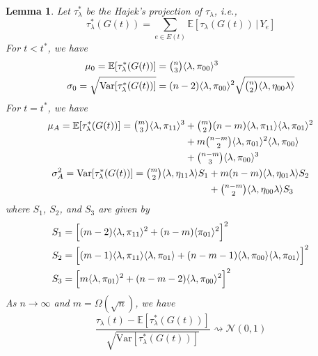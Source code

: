 \documentclass[final]{IEEEtran}
\newtheorem{lemma}[theorem]{Lemma}
\theoremstyle{definition}
\begin{document}
\begin{lemma}
  \label{lem:3}
  Let $\tau_{\lambda}^{*}$ be the Hajek's projection of $\tau_{\lambda}$, i.e.,
\begin{equation}
  \label{eq:46}
  \tau_{\lambda}^{*}(G(t)) = \sum_{e \in E(t)} \mathbb{E}[
  \tau_{\lambda}(G(t)) \, \lvert \, Y_{e}]
\end{equation}
For $t < t^{*}$, we have
\begin{align*}
  \mu_0 = \mathbb{E}[\tau_{\lambda}^{*}(G(t))] &= \tbinom{n}{3} \langle 
  \lambda, \pi_{00} \rangle^{3} \\
  \sigma_0 = \sqrt{\mathrm{Var}[\tau_{\lambda}^{*}(G(t))]} &= (n-2) \langle \lambda,
  \pi_{00} \rangle^{2} \sqrt{\tbinom{n}{2} \langle \lambda, \eta_{00}
  \lambda \rangle}
\end{align*}
For $t = t^{*}$, we have
  \begin{gather*}
    \label{eq:42}
    \begin{split}
    \mu_A = \mathbb{E}[\tau_{\lambda}^{*}(G(t))] = \tbinom{m}{3}
    \langle \lambda, \pi_{11} \rangle^{3} &+
    \tbinom{m}{2}(n-m) \langle \lambda, \pi_{11} \rangle \langle
    \lambda, \pi_{01} \rangle^{2} \\ &+ m \tbinom{n-m}{2} \langle \lambda,
    \pi_{01} \rangle^{2} \langle \lambda, \pi_{00} \rangle \\ &+
    \tbinom{n-m}{3} \langle \lambda, \pi_{00} \rangle^{3}
    \end{split} \\
    \begin{split}
    \sigma_A^{2} = \mathrm{Var}[\tau_{\lambda}^{*}(G(t))] = \tbinom{m}{2} \langle \lambda, \eta_{11} \lambda
    \rangle S_1  
    &+ m(n-m) \langle \lambda, \eta_{01} \lambda \rangle S_2  \\
    &+ \tbinom{n-m}{2} \langle \lambda, \eta_{00} \lambda \rangle S_3
    \end{split}
  \end{gather*}
  where $S_1$, $S_2$, and $S_3$ are given by
\begin{align*}
    S_1 &= \Bigl[(m-2) \langle \lambda, \pi_{11} \rangle^{2} + (n-m)
    \langle \pi_{01} \rangle^{2} \Bigr]^{2} \\ 
    S_2 &= \Bigl[(m-1)
    \langle \lambda, \pi_{11} \rangle \langle \lambda, \pi_{01}
    \rangle + (n-m-1) \langle \lambda, \pi_{00} \rangle \langle
    \lambda, \pi_{01} \rangle \Bigr]^{2} \\
    S_3 &= \Bigl[m \langle \lambda, \pi_{01} \rangle^{2} + (n-m-2) \langle
    \lambda, \pi_{00} \rangle^{2} \Bigr]^{2} 
    \end{align*}
  As $n \rightarrow \infty$ and $m = \Omega(\sqrt{n})$, we have
  \begin{equation}
    \label{eq:49}
    \frac{\tau_{\lambda}(t) -
      \mathbb{E}[\tau_{\lambda}^{*}(G(t))]}{\sqrt{\mathrm{Var}[\tau_{\lambda}^{*}(G(t))]}}
      \rightsquigarrow \mathcal{N}(0,1)
  \end{equation}
\end{lemma}
\end{document}
